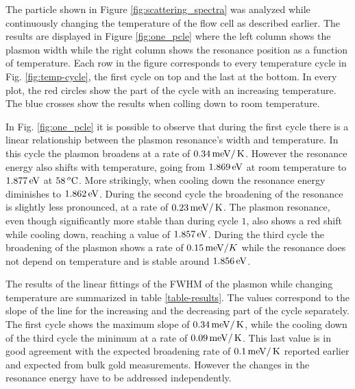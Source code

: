The particle shown in Figure \ref{fig:scattering_spectra} was analyzed while
continuously changing the temperature of the flow cell as described earlier. The
results are displayed in Figure \ref{fig:one_pcle} where the left column shows
the plasmon width while the right column shows the resonance position as a
function of temperature. Each row in the figure corresponds to every temperature
cycle in Fig. \ref{fig:temp-cycle}, the first cycle on top and the last at the
bottom. In every plot, the red circles show the part of the cycle with
an increasing temperature. The blue crosses show the results when
colling down to room temperature. 

In Fig. \ref{fig:one_pcle} it is possible to observe that during the first cycle
there is a linear relationship between the plasmon resonance's width and
temperature. In this cycle the plasmon broadens at a rate of $0.34\,\textrm{meV}/\,\textrm{K}$.
However the resonance energy also shifts with temperature, going from $1.869\,\textrm{eV}$
at room temperature to $1.877\,\textrm{eV}$ at $58\,^o\textrm{C}$. More strikingly, when cooling
down the resonance energy diminishes to $1.862\,\textrm{eV}$. During the second cycle the
broadening of the resonance is slightly less pronounced, at a rate of
$0.23\,\textrm{meV}/\,\textrm{K}$. The plasmon resonance, even though significantly more stable
than during cycle $1$, also shows a red shift while cooling down, reaching a value of
$1.857\,\textrm{eV}$. During the third cycle the broadening of the plasmon shows a rate of
$0.15\,\textrm{meV}/K$ while the resonance does not depend on temperature and is stable
around $1.856\,\textrm{eV}$.

The results of the linear fittings of the FWHM of the plasmon while changing
temperature are summarized in table \ref{table-results}. The values correspond
to the slope of the line for the increasing and the decreasing part of the cycle
separately. The first cycle shows the maximum slope of $0.34\,\textrm{meV}/\,\textrm{K}$, while the
cooling down of the third cycle the minimum at a rate of $0.09\,\textrm{meV}/\,\textrm{K}$. This
last value is in good agreement with the expected broadening rate of
$0.1\,\textrm{meV}/\,\textrm{K}$ reported earlier\cite{Liu2009b,Konrad2013} and expected from bulk gold
measurements. However the changes in the resonance energy have to be addressed
independently.

